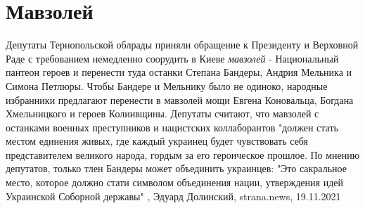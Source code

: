  
 
 
 
 
\chapter{Мавзолей}
\label{sec:slova.mavzolej}

Депутаты Тернопольской облрады приняли обращение к Президенту и Верховной Раде
с требованием немедленно соорудить в Киеве \emph{мавзолей} - Национальный пантеон
героев и перенести туда останки Степана Бандеры, Андрия Мельника и Симона
Петлюры.  Чтобы Бандере и Мельнику было не одиноко, народные избранники
предлагают перенести в мавзолей мощи Евгена Коновальца, Богдана Хмельницкого и
героев Колиивщины.  Депутаты считают, что мавзолей с останками военных
преступников и нацистских коллаборантов "должен стать местом единения живых,
где каждый украинец будет чувствовать себя представителем великого народа,
гордым за его героическое прошлое.  По мнению депутатов, только тлен Бандеры
может объединить украинцев: "Это сакральное место, которое должно стати
символом объединения нации, утверждения идей Украинской Соборной державы"
, 
Эдуард Долинский, strana.news, 19.11.2021

